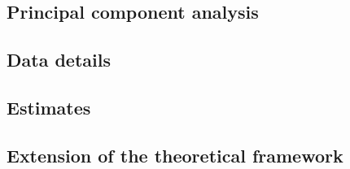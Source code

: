 \begin{refsection}
    \subsection{Principal component analysis} \label{chap3-pca}
    
    \clearpage
    \subsection{Data details} \label{chap3-details}
    
    \clearpage
    \subsection{Estimates} \label{chap3-estimates}
    
    \clearpage
    \subsection{Extension of the theoretical framework} \label{chap3-model2}
    

\end{refsection}